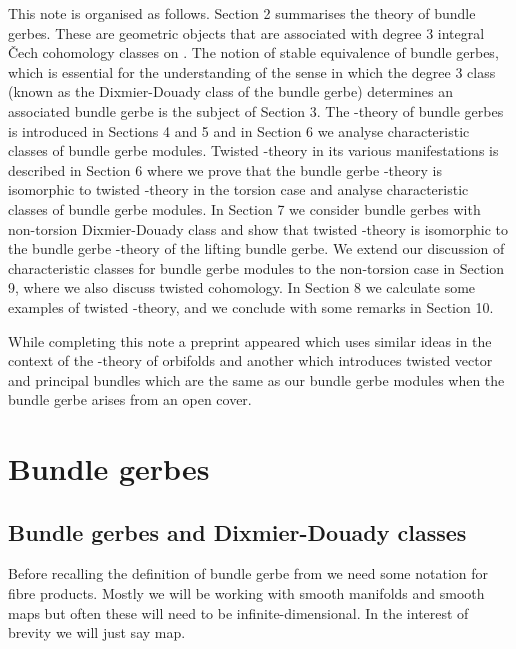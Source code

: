 \documentclass[a4paper,reqno]{amsart}
\theoremstyle{plain}
\theoremstyle{definition}
\theoremstyle{remark}
\numberwithin{equation}{section}
\numberwithin{figure}{section}
\providecommand{\UK}{U{_\mathcal K}}
\providecommand{\<}{\langle}
\renewcommand{\>}{\rangle}
\begin{document}
This note is organised as follows. Section 2 summarises the theory of
bundle gerbes. These are geometric objects that are associated with
degree 3 integral \v Cech cohomology classes on \coordHE{}. The notion of stable
equivalence of bundle gerbes, which is essential for the understanding
of the sense in which the degree 3 class (known as the Dixmier-Douady
class of the bundle gerbe) determines an associated bundle gerbe is
the subject of Section 3.  The \coordHE{}-theory of bundle gerbes is
introduced in Sections 4 and 5 and in Section 6 we analyse
characteristic classes of bundle gerbe modules.   
Twisted \coordHE{}-theory in its various
manifestations is described in Section 6 where we prove that the
bundle gerbe \coordHE{}-theory is isomorphic to twisted \coordHE{}-theory in the torsion
case and analyse characteristic classes of bundle gerbe modules.
In Section 7 we consider bundle gerbes with non-torsion
Dixmier-Douady class  and show that twisted \coordHE{}-theory  is isomorphic
to the  \myHighlight{$\UK$}\coordHE{} bundle gerbe \coordHE{}-theory
of the lifting bundle gerbe.
We extend our discussion of characteristic classes for bundle 
gerbe modules to the non-torsion case in Section 9, where 
we also discuss twisted cohomology.
In Section 8 we calculate some examples of twisted \coordHE{}-theory,
and we conclude with some remarks in Section 10.

While completing this note a preprint \cite{LupUri} appeared which
uses similar ideas in the context of the \coordHE{}-theory of orbifolds and
another \cite{Mac} which introduces twisted vector and principal
bundles which are the same as our bundle gerbe modules when the bundle
gerbe arises from an open cover.


\section{Bundle gerbes}
\label{bundle_gerbes}

\subsection{Bundle gerbes and Dixmier-Douady classes}

Before recalling the definition of bundle gerbe from \cite{Mur} we
need some notation for fibre products.  Mostly we will be working with
smooth manifolds and smooth maps but often these will need to be
infinite-dimensional. In the interest of brevity we will just say map.
\end{document}
